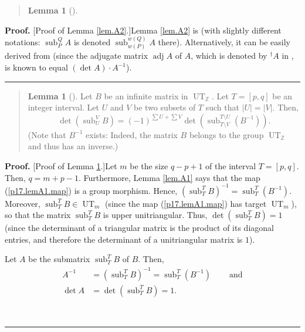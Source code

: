 \documentclass[numbers=enddot,12pt,final,onecolumn,notitlepage]{scrartcl}%
\newenvironment{statement}{\begin{quote}}{\end{quote}}
\theoremstyle{definition}
\newtheorem{lem}[theo]{Lemma}
\newenvironment{lemmain}[1][]
{\begin{statement}\begin{lem}[#1]}
{\end{lem}\end{statement}}
\newenvironment{proof}[1][Proof]{\noindent\textbf{#1.} }{\ \rule{0.5em}{0.5em}}
\newenvironment{lemmain}[1][Proof]{\noindent\textbf{#1.} }{\ \rule{0.5em}{0.5em}}
\let\sumnonlimits\sum
\renewcommand{\sum}{\sumnonlimits\limits}
\begin{document}
\begin{enumerate}
\begin{lemmain}
\end{lemmain}

\begin{proof}
[Proof of Lemma \ref{lem.A2}.]Lemma \ref{lem.A2} is \cite[Exercise
6.56]{detnotes} (with slightly different notations: $\operatorname*{sub}%
\nolimits_{P}^{Q}A$ is denoted $\operatorname*{sub}\nolimits_{w\left(
P\right)  }^{w\left(  Q\right)  }A$ there). Alternatively, it can be easily
derived from \cite[(APP.1.5.2)]{LLPT95} (since the adjugate matrix
$\operatorname*{adj}A$ of $A$, which is denoted by $^{\dag}A$ in
\cite{LLPT95}, is known to equal $\left(  \det A\right)  \cdot A^{-1}$).
\end{proof}

\begin{lemmain}
\label{lem.A3}Let $B$ be an infinite matrix in $\operatorname*{UT}%
\nolimits_{\mathbb{Z}}$. Let $T=\left[  p,q\right]  $ be an integer interval.
Let $U$ and $V$ be two subsets of $T$ such that $\left\vert U\right\vert
=\left\vert V\right\vert $. Then,%
\[
\det\left(  \operatorname*{sub}\nolimits_{U}^{V}B\right)  =\left(  -1\right)
^{\sum U+\sum V}\det\left(  \operatorname*{sub}\nolimits_{T\setminus
V}^{T\setminus U}\left(  B^{-1}\right)  \right)  .
\]
(Note that $B^{-1}$ exists: Indeed, the matrix $B$ belongs to the group
$\operatorname*{UT}\nolimits_{\mathbb{Z}}$ and thus has an inverse.)
\end{lemmain}

\begin{proof}
[Proof of Lemma \ref{lem.A3}.]Let $m$ be the size $q-p+1$ of the interval
$T=\left[  p,q\right]  $. Then, $q=m+p-1$. Furthermore, Lemma \ref{lem.A1}
says that the map (\ref{p17.lemA1.map}) is a group morphism. Hence, $\left(
\operatorname*{sub}\nolimits_{T}^{T}B\right)  ^{-1}=\operatorname*{sub}%
\nolimits_{T}^{T}\left(  B^{-1}\right)  $. Moreover, $\operatorname*{sub}%
\nolimits_{T}^{T}B\in\operatorname*{UT}\nolimits_{m}$ (since the map
(\ref{p17.lemA1.map}) has target $\operatorname*{UT}\nolimits_{m}$), so that
the matrix $\operatorname*{sub}\nolimits_{T}^{T}B$ is upper unitriangular.
Thus, $\det\left(  \operatorname*{sub}\nolimits_{T}^{T}B\right)  =1$ (since
the determinant of a triangular matrix is the product of its diagonal entries,
and therefore the determinant of a unitriangular matrix is $1$).

Let $A$ be the submatrix $\operatorname*{sub}\nolimits_{T}^{T}B$ of $B$.
Then,
\begin{align}
A^{-1}  &  =\left(  \operatorname*{sub}\nolimits_{T}^{T}B\right)
^{-1}=\operatorname*{sub}\nolimits_{T}^{T}\left(  B^{-1}\right)
\ \ \ \ \ \ \ \ \ \ \text{and}\label{p17.lemA3.pf.A1}\\
\det A  &  =\det\left(  \operatorname*{sub}\nolimits_{T}^{T}B\right)  =1.
\label{p17.lemA3.pf.A2}%
\end{align}



\end{proof}
\end{enumerate}
\end{document}
